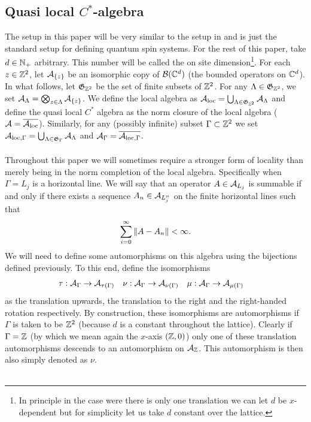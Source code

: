 \documentclass[12pt,a4paper,twoside]{article}
\numberwithin{equation}{section}
\begin{document}
\subsection{Quasi local $C^*$-algebra}\label{sec:QuasiLocalC*Algebra}
The setup in this paper will be very similar to the setup in \cite{ogata2021h3gmathbb} and is just the standard setup for defining quantum spin systems. For the rest of this paper, take $d\in\NN_+$ arbitrary. This number will be called the on site dimension\footnote{In principle in the case were there is only one translation we can let $d$ be $x$-dependent but for simplicity let us take $d$ constant over the lattice.}. For each $z\in\ZZ^2$, let $\AA_{\{z\}}$ be an isomorphic copy of $\BB(\CC^d)$ (the bounded operators on $\CC^d$). In what follows, let $\mathfrak{G}_{\ZZ^2}$ be the set of finite subsets of $\ZZ^2$. For any $\Lambda\in\mathfrak{G}_{\ZZ^2}$, we set $\AA_\Lambda=\bigotimes_{z\in\Lambda}\AA_{\{z\}}$. We define the local algebra as $\AA_{\text{loc}}=\bigcup_{\Lambda\in \mathfrak{G}_{\ZZ^2}}\AA_{\Lambda}$ and define the quasi local $C^*$ algebra as the norm closure of the local algebra ($\AA=\overline{\AA_{\text{loc}}}$). Similarly, for any (possibly infinite) subset $\Gamma\subset\ZZ^2$ we set $\AA_{\text{loc},\Gamma}=\bigcup_{\Lambda\in \mathfrak{G}_{\Gamma}}\AA_{\Lambda}$ and $\AA_\Gamma=\overline{\AA_{\text{loc},\Gamma}}$.\\\\
Throughout this paper we will sometimes require a stronger form of locality than merely being in the norm completion of the local algebra. Specifically when $\Gamma=L_j$ is a horizontal line. We will say that an operator $A\in\AA_{L_j}$ is summable if and only if there exists a sequence $A_n\in\AA_{L_{j}^n}$ on the finite horizontal lines such that
\begin{equation}
	\sum_{i=0}^{\infty}\norm{A-A_n}<\infty.
\end{equation}
We will need to define some automorphisms on this algebra using the bijections defined previously. To this end, define the isomorphisms
\begin{align}
\tau&:\AA_\Gamma\rightarrow\AA_{\tau(\Gamma)}&\nu&:\AA_\Gamma\rightarrow\AA_{\nu(\Gamma)}&\mu&:\AA_\Gamma\rightarrow\AA_{\mu(\Gamma)}
\end{align}
as the translation upwards, the translation to the right and the right-handed rotation respectively. By construction, these isomorphisms are automorphisms if $\Gamma$ is taken to be $\ZZ^2$ (because $d$ is a constant throughout the lattice). Clearly if $\Gamma=\ZZ$ (by which we mean again the $x$-axis $(\ZZ,0)$) only one of these translation automorphisms descends to an automorphism on $\AA_{\ZZ}$. This automorphism is then also simply denoted as $\nu$.\\\\
\end{document}
